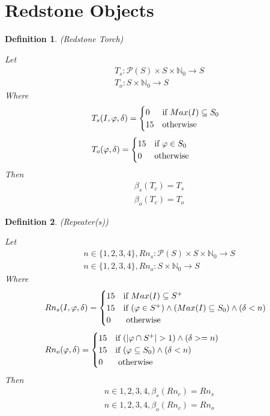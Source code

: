 \documentclass{article}
\newtheorem{defn}{Definition}[section]
\begin{document}
\section{Redstone Objects}

\begin{defn} (Redstone Torch)

	Let
	\begin{align}
		& T_{s} : \mathcal{P}(S) \times S \times \mathbb{N}_{0} \rightarrow S \\
		& T_{o} : S \times \mathbb{N}_{0} \rightarrow S
	\end{align}
	Where
	\begin{align}
		& T_{s}(I, \varphi, \delta) =
		\begin{cases}
			0 & \text{if } Max(I) \subseteq S_{0} \\
			15 & \text{otherwise}
		\end{cases} \\[\jot]
		& T_{o}(\varphi, \delta) =
		\begin{cases}
			15 & \text{if } \varphi \in S_{0} \\
			0 & \text{otherwise}
		\end{cases}
	\end{align}
	Then
	\begin{align}
		& \beta_{s}(T_{c}) = T_{s} \\
		& \beta_{o}(T_{c}) = T_{o}
	\end{align}
\end{defn}

\begin{defn} (Repeater(s))
	
	Let
	\begin{align}
		& n \in \{1, 2, 3, 4\}, Rn_{s} : \mathcal{P} (S) \times S \times \mathbb{N}_{0} \rightarrow S \\
		& n \in \{1, 2, 3, 4\}, Rn_{o} : S \times \mathbb{N}_{0} \rightarrow S
	\end{align}
	Where
	\begin{align}
		& Rn_{s}(I, \varphi, \delta) = 
		\begin{cases}
			15 & \text{if } Max(I) \subseteq S^+\\
			15 & \text{if } (\varphi \in S^+) \land (Max(I) \subseteq S_{0}) \land (\delta < n) \\
			0 & \text{ otherwise }
		\end{cases} \\[\jot]
		& Rn_{o}(\varphi, \delta) = 
		\begin{cases}
			15 & \text{if } (|\varphi \cap S^+| > 1) \land (\delta >= n) \\
			15 & \text{if } (\varphi \subseteq S_{0}) \land (\delta < n) \\
			0 & \text{ otherwise }
			\end{cases}
	\end{align}
	Then
	\begin{align}
			& n \in {1, 2, 3, 4}, \beta_{s}(Rn_{c}) = Rn_{s} \\
			& n \in {1, 2, 3, 4}, \beta_{o}(Rn_{c}) = Rn_{o}
	\end{align}
\end{defn}
\end{document}

